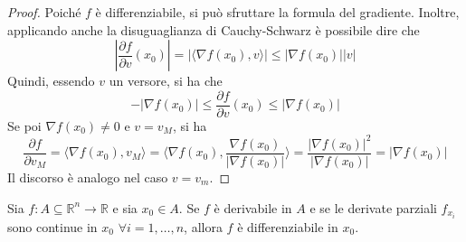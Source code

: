     \begin{proof}
        Poiché $f$ è differenziabile, si può sfruttare la formula del gradiente. Inoltre, applicando anche la disuguaglianza di Cauchy-Schwarz è possibile dire che
       \begin{equation}
        \left|\frac{\partial f}{\partial v}(x_0)\right|= \left|\langle \nabla f(x_0), v\rangle\right| \leq \left|\nabla f(x_0)\right| \left|v\right|
       \end{equation}
       Quindi, essendo $v$ un versore, si ha che 
       \begin{equation}
        - \left|\nabla f(x_0)\right| \leq \frac{\partial f}{\partial v}(x_0) \leq \left|\nabla f(x_0)\right|
       \end{equation}
       Se poi $\nabla f(x_0) \neq 0$ e $v=v_M$, si ha
       \begin{equation}
        \frac{\partial f }{\partial v_M}= \langle \nabla f(x_0), v_M\rangle = \langle \nabla f(x_0), \frac{\nabla f (x_0)}{|\nabla f(x_0)|}\rangle=\frac{|\nabla f(x_0)|^2}{|\nabla f(x_0)|}=|\nabla f(x_0)|
       \end{equation}
       Il discorso è analogo nel caso $v=v_m$.
    \end{proof}
\begin{theorem} \label{Teo: Differenziale totale}
    Sia $f:A \subseteq \mathbb{R}^n \to \mathbb{R}$ e sia $x_0 \in A$. Se $f$ è derivabile in $A$ e se le derivate parziali $f_{x_i}$ sono continue in $x_0$ $\forall i=1, \dots, n$, allora $f$ è differenziabile in $x_0$.
\end{theorem}
